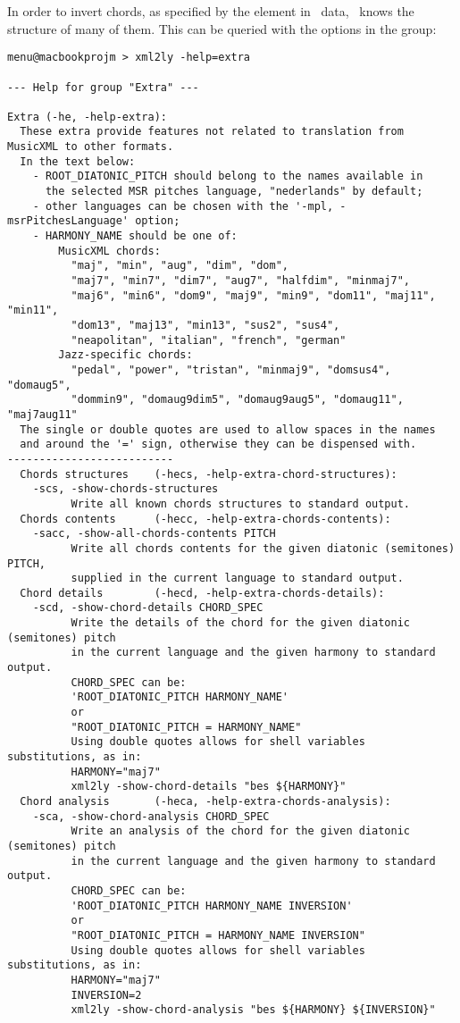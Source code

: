 In order to invert chords, as specified by the  element in \mxml\ data, \mxmlToLy\ knows the structure of many of them. This can be queried with the options in the  group:
\begin{lstlisting}[language=MusicXML]
menu@macbookprojm > xml2ly -help=extra

--- Help for group "Extra" ---

Extra (-he, -help-extra):
  These extra provide features not related to translation from MusicXML to other formats.
  In the text below:
    - ROOT_DIATONIC_PITCH should belong to the names available in
      the selected MSR pitches language, "nederlands" by default;
    - other languages can be chosen with the '-mpl, -msrPitchesLanguage' option;
    - HARMONY_NAME should be one of:
        MusicXML chords:
          "maj", "min", "aug", "dim", "dom",
          "maj7", "min7", "dim7", "aug7", "halfdim", "minmaj7",
          "maj6", "min6", "dom9", "maj9", "min9", "dom11", "maj11", "min11",
          "dom13", "maj13", "min13", "sus2", "sus4",
          "neapolitan", "italian", "french", "german"
        Jazz-specific chords:
          "pedal", "power", "tristan", "minmaj9", "domsus4", "domaug5",
          "dommin9", "domaug9dim5", "domaug9aug5", "domaug11", "maj7aug11"
  The single or double quotes are used to allow spaces in the names
  and around the '=' sign, otherwise they can be dispensed with.
--------------------------
  Chords structures    (-hecs, -help-extra-chord-structures):
    -scs, -show-chords-structures
          Write all known chords structures to standard output.
  Chords contents      (-hecc, -help-extra-chords-contents):
    -sacc, -show-all-chords-contents PITCH
          Write all chords contents for the given diatonic (semitones) PITCH,
          supplied in the current language to standard output.
  Chord details        (-hecd, -help-extra-chords-details):
    -scd, -show-chord-details CHORD_SPEC
          Write the details of the chord for the given diatonic (semitones) pitch
          in the current language and the given harmony to standard output.
          CHORD_SPEC can be:
          'ROOT_DIATONIC_PITCH HARMONY_NAME'
          or
          "ROOT_DIATONIC_PITCH = HARMONY_NAME"
          Using double quotes allows for shell variables substitutions, as in:
          HARMONY="maj7"
          xml2ly -show-chord-details "bes ${HARMONY}"
  Chord analysis       (-heca, -help-extra-chords-analysis):
    -sca, -show-chord-analysis CHORD_SPEC
          Write an analysis of the chord for the given diatonic (semitones) pitch
          in the current language and the given harmony to standard output.
          CHORD_SPEC can be:
          'ROOT_DIATONIC_PITCH HARMONY_NAME INVERSION'
          or
          "ROOT_DIATONIC_PITCH = HARMONY_NAME INVERSION"
          Using double quotes allows for shell variables substitutions, as in:
          HARMONY="maj7"
          INVERSION=2
          xml2ly -show-chord-analysis "bes ${HARMONY} ${INVERSION}"
\end{lstlisting}

